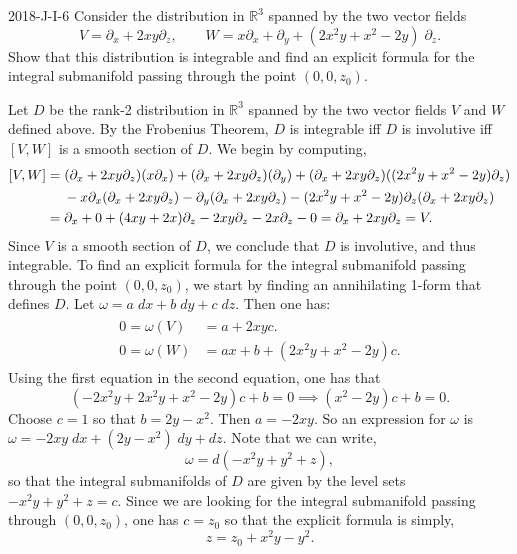 \documentclass{article}
\begin{document}
	
	\begin{prb}{2018-J-I-6}
		Consider the distribution in $\mathbb{R}^{3}$ spanned by the two vector fields 
		\begin{equation*}
			V = \partial_{x} + 2xy\partial_{z}, \qquad W = x\partial_{x} + \partial_{y} + (2x^{2}y + x^{2} - 2y)\;\partial_{z}. 
		\end{equation*}
		Show that this distribution is integrable and find an explicit formula for the integral submanifold passing through the point $(0,0,z_{0})$. 
	\end{prb}
	Let $D$ be the rank-2 distribution in $\mathbb{R}^{3}$ spanned by the two vector fields $V$ and $W$ defined above. By the Frobenius Theorem, $D$ is integrable iff $D$ is involutive iff $[V, W]$ is a smooth section of $D$. We begin by computing, 
	\begin{align*}
		\begin{split}
			[V, W] &= (\partial_{x} + 2xy\partial_{z})(x\partial_{x}) + (\partial_{x} + 2xy\partial_{z})(\partial_{y}) + (\partial_{x}+ 2xy \partial_{z})((2x^{2}y + x^{2} - 2y)\partial_{z}) \\
			&\textcolor{white}{=} \hspace{5pt}- x\partial_{x}(\partial_{x} + 2xy\partial_{z}) - \partial_{y}(\partial_{x} + 2xy\partial_{z}) - (2x^{2}y + x^{2}-2y)\partial_{z}(\partial_{x}+ 2xy\partial_{z}) \\
			&= \partial_{x} + 0 + (4xy + 2x)\partial_{z} - 2xy\partial_{z} - 2x\partial_{z} - 0 = \partial_{x} + 2xy\partial_{z} = V. 
		\end{split} 
	\end{align*}
	Since $V$ is a smooth section of $D$, we conclude that $D$ is involutive, and thus integrable. To find an explicit formula for the integral submanifold passing through the point $(0,0,z_{0})$, we start by finding an annihilating 1-form that defines $D$. Let $\omega = a\;dx + b\;dy + c\;dz$. Then one has: 
	\begin{align*}
		\begin{split}
			0 = \omega(V) &= a + 2xyc.  \\
			0 = \omega(W) &= ax + b + (2x^{2}y + x^{2} -2y)c. 
		\end{split}
	\end{align*}
	Using the first equation in the second equation, one has that 
	\begin{equation*}
		(-2x^{2}y + 2x^{2}y + x^{2} - 2y)c + b = 0 \implies (x^{2}-2y)c + b= 0. 
	\end{equation*}
	Choose $c = 1$ so that $b = 2y - x^{2}$. Then $a = -2xy$. So an expression for $\omega$ is $\omega = -2xy\;dx + (2y - x^{2})\;dy + dz$. Note that we can write, 
	\begin{equation*}
		\omega = d(-x^{2}y + y^{2} + z), 
	\end{equation*}
	so that the integral submanifolds of $D$ are given by the level sets $-x^{2}y + y^{2} + z = c$. Since we are looking for the integral submanifold passing through $(0,0,z_{0})$, one has $c = z_{0}$ so that the explicit formula is simply, 
	\begin{equation*}
		z = z_{0} + x^{2}y - y^{2}. 
	\end{equation*}
\end{document}
